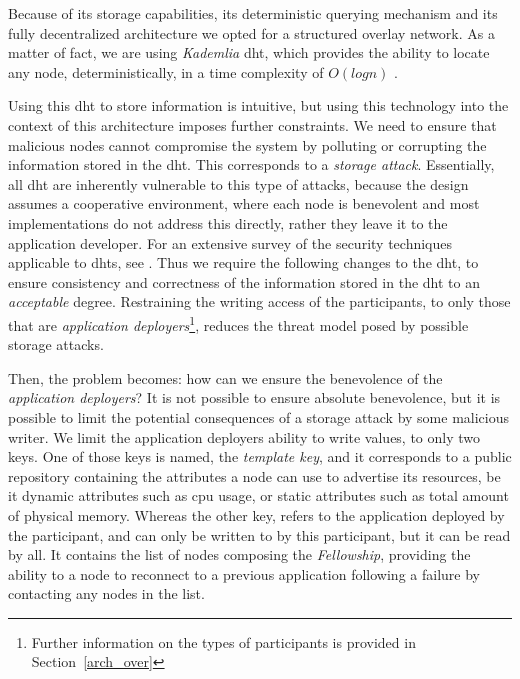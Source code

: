 \documentclass[12pt, titlepage]{uo_temp}
\begin{document}
     Because of its storage capabilities, its deterministic querying mechanism and its
     fully decentralized architecture we opted for a structured overlay network.  As a
     matter of fact, we are using \emph{Kademlia} \gls{dht}, which provides the ability to
     locate any node, deterministically, in a time complexity of $O(log n)$
     \cite{maymounkov2002kademlia}.

     Using this \gls{dht} to store information is intuitive, but using this technology
     into the context of this architecture imposes further constraints. We need to ensure
     that malicious nodes cannot compromise the system by polluting or corrupting the
     information stored in the \gls{dht}. This corresponds to a \emph{storage attack}.
     Essentially, all \gls{dht} are inherently vulnerable to this type of attacks, because
     the design assumes a cooperative environment, where each node is benevolent and most
     implementations do not address this directly, rather they leave it to the application
     developer. For an extensive survey of the security techniques applicable to
     \gls{dht}s, see \cite{urdaneta2011survey}. Thus we require the following changes to
     the \gls{dht}, to ensure consistency and correctness of the information stored in the
     \gls{dht} to an \emph{acceptable} degree. Restraining the writing access of the
     participants, to only those that are \emph{application deployers}\footnote{Further
       information on the types of participants is provided in Section~\ref{arch_over}},
     reduces the threat model posed by possible storage attacks.

     Then, the problem becomes: how can we ensure the benevolence of the \emph{application
       deployers}? It is not possible to ensure absolute benevolence, but it is possible
     to limit the potential consequences of a storage attack by some malicious writer. We
     limit the application deployers ability to write values, to only two keys. One of
     those keys is named, the \emph{template key}, and it corresponds to a public
     repository containing the attributes a node can use to advertise its resources, be it
     dynamic attributes such as \gls{cpu} usage, or static attributes such as total amount
     of physical memory. Whereas the other key, refers to the application deployed by the
     participant, and can only be written to by this participant, but it can be read by
     all. It contains the list of nodes composing the \emph{Fellowship}, providing the
     ability to a node to reconnect to a previous application following a failure by
     contacting any nodes in the list.
     
\end{document}
